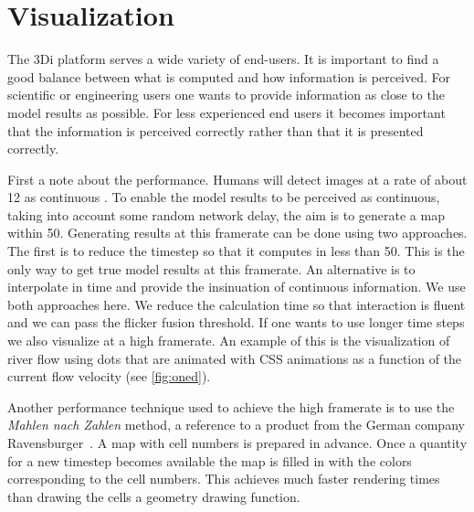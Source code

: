\documentclass[a4paper]{article}
\begin{document}
\section{Visualization}
The 3Di platform serves a wide variety of end-users. It is important to find a good balance between what is computed and how information is perceived. For scientific or engineering users one wants to provide information as close to the model results as possible. For less experienced end users it becomes important that the information is perceived correctly rather than that it is presented correctly.

First a note about the performance. Humans will detect images at a rate of about \si{12}{\per\second} as continuous \citep{Landis1954}. To enable the model results to be perceived as continuous, taking into account some random network delay, the aim is to generate a map within \si{50}{\mili\second}. Generating results at this framerate can be done using two approaches. The first is to reduce the timestep so that it computes in less than \si{50}{\mili\second}. This is the only way to get true model results at this framerate. An alternative is to interpolate in time and provide the insinuation of continuous information. We use both approaches here. We reduce the calculation time so that interaction is fluent and we can pass the flicker fusion threshold. If one wants to use longer time steps we also visualize at a high framerate. An example of this is the visualization of river flow using dots that are animated with \ac{CSS} animations as a function of the current flow velocity (see \autoref{fig:oned}).

Another performance technique used to achieve the high framerate is to use the \emph{Mahlen nach Zahlen} method, a reference to a product from the German company Ravensburger~\textregistered. A map with cell numbers is prepared in advance. Once a quantity for a new timestep becomes available the map is filled in with the colors corresponding to the cell numbers. This achieves much faster rendering times than drawing the cells a geometry drawing function.
\end{document}
